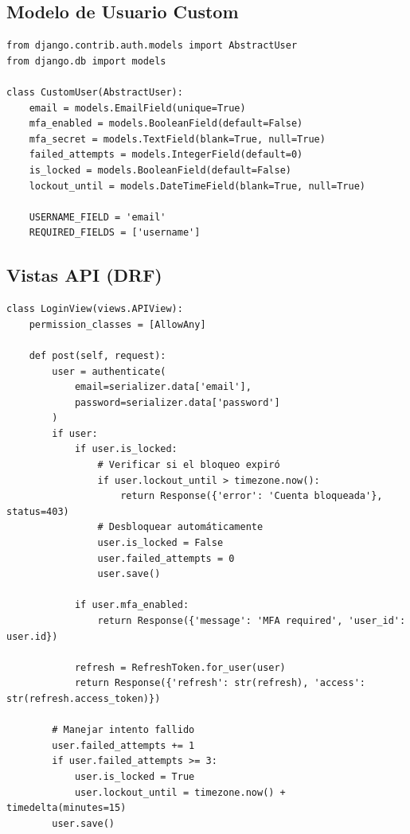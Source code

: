 \documentclass[12pt,a4paper,openany]{article}
\begin{document}
\subsection{Modelo de Usuario Custom}

\begin{lstlisting}[style=pythonstyle, caption={CustomUser model}]
from django.contrib.auth.models import AbstractUser
from django.db import models

class CustomUser(AbstractUser):
    email = models.EmailField(unique=True)
    mfa_enabled = models.BooleanField(default=False)
    mfa_secret = models.TextField(blank=True, null=True)
    failed_attempts = models.IntegerField(default=0)
    is_locked = models.BooleanField(default=False)
    lockout_until = models.DateTimeField(blank=True, null=True)

    USERNAME_FIELD = 'email'
    REQUIRED_FIELDS = ['username']
\end{lstlisting}

\subsection{Vistas API (DRF)}

\begin{lstlisting}[style=pythonstyle, caption={Vistas de autenticación Django}]
class LoginView(views.APIView):
    permission_classes = [AllowAny]

    def post(self, request):
        user = authenticate(
            email=serializer.data['email'],
            password=serializer.data['password']
        )
        if user:
            if user.is_locked:
                # Verificar si el bloqueo expiró
                if user.lockout_until > timezone.now():
                    return Response({'error': 'Cuenta bloqueada'}, status=403)
                # Desbloquear automáticamente
                user.is_locked = False
                user.failed_attempts = 0
                user.save()
            
            if user.mfa_enabled:
                return Response({'message': 'MFA required', 'user_id': user.id})
            
            refresh = RefreshToken.for_user(user)
            return Response({'refresh': str(refresh), 'access': str(refresh.access_token)})
        
        # Manejar intento fallido
        user.failed_attempts += 1
        if user.failed_attempts >= 3:
            user.is_locked = True
            user.lockout_until = timezone.now() + timedelta(minutes=15)
        user.save()
\end{lstlisting}
\end{document}
